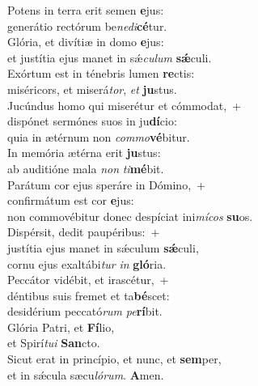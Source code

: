 \evenverse Potens in terra erit semen \textbf{e}jus:~\*\\
\evenverse generátio rectórum be\textit{ne}\textit{di}\textbf{cé}tur.\\
\oddverse Glória, et divítiæ in domo \textbf{e}jus:~\*\\
\oddverse et justítia ejus manet in sǽ\textit{cu}\textit{lum} \textbf{sǽ}culi.\\
\evenverse Exórtum est in ténebris lumen \textbf{re}ctis:~\*\\
\evenverse miséricors, et miserá\textit{tor}, \textit{et} \textbf{ju}stus.\\
\oddverse Jucúndus homo qui miserétur et cómmodat,~+\\
\oddverse  dispónet sermónes suos in ju\textbf{dí}cio:~\*\\
\oddverse quia in ætérnum non \textit{com}\textit{mo}\textbf{vé}bitur.\\
\evenverse In memória ætérna erit \textbf{ju}stus:~\*\\
\evenverse ab auditióne mala \textit{non} \textit{ti}\textbf{mé}bit.\\
\oddverse Parátum cor ejus speráre in Dómino,~+\\
\oddverse  confirmátum est cor \textbf{e}jus:~\*\\
\oddverse non commovébitur donec despíciat ini\textit{mí}\textit{cos} \textbf{su}os.\\
\evenverse Dispérsit, dedit paupéribus:~+\\
\evenverse  justítia ejus manet in sǽculum \textbf{sǽ}culi,~\*\\
\evenverse cornu ejus exaltábi\textit{tur} \textit{in} \textbf{gló}ria.\\
\oddverse Peccátor vidébit, et irascétur,~+\\
\oddverse  déntibus suis fremet et ta\textbf{bé}scet:~\*\\
\oddverse desidérium peccató\textit{rum} \textit{pe}\textbf{rí}bit.\\
\evenverse Glória Patri, et \textbf{Fí}lio,~\*\\
\evenverse et Spirí\textit{tu}\textit{i} \textbf{San}cto.\\
\oddverse Sicut erat in princípio, et nunc, et \textbf{sem}per,~\*\\
\oddverse et in sǽcula sæcu\textit{ló}\textit{rum}. \textbf{A}men.\\
